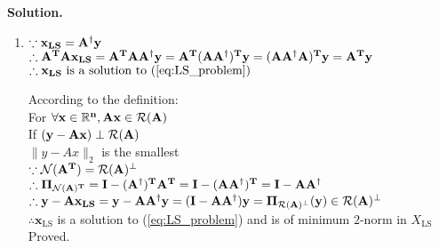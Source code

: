 \documentclass[english,onecolumn]{IEEEtran}
\begin{document}
\noindent
\textbf{Solution.}
\begin{enumerate}
    \item
    $\because \bf x_{LS} = A^{\dagger} y $\\
    $\therefore \bf A^T A x_{LS} = A^T A A^{\dagger} y = A^T (A A^{\dagger})^T y = (A A^{\dagger} A)^T y = A^T y   $\\
    $\therefore \bf x_{LS} \text{ is a solution to (\ref{eq:LS_problem}) } $
    
		According to the definition:\\
    For $\bf \forall x \in \mathbb{R}^{n} , A x \in \mathcal{R}(A)$\\
    If $\bf (y - A x ) \perp \mathcal{R}(A) $\\
    $\|y- A x \|_2 $ is the smallest\\
    $\because \bf \mathcal{N}(A^T) = \mathcal{R}(A)^{\perp} $\\
    $\therefore \bf \Pi_{\mathcal{N}(A)^T} =  I -(A^{\dagger})^T A^T = I -(A A^{\dagger})^T = I - A A^{\dagger}      $\\
    $\therefore \bf y-A x_{LS} = y - A A^{\dagger} y = (I - A A^{\dagger}) y = \Pi_{\mathcal{R}(A)^{\perp}}(y) \in \mathcal{R}(A)^{\perp}  $\\
    $\therefore \mathbf{x}_{\mathrm{LS}}$ is a solution to (\ref{eq:LS_problem}) and is of minimum $2$-norm in $X_{\mathrm{LS}}$\\
    Proved.
\end{enumerate}
\end{document}

